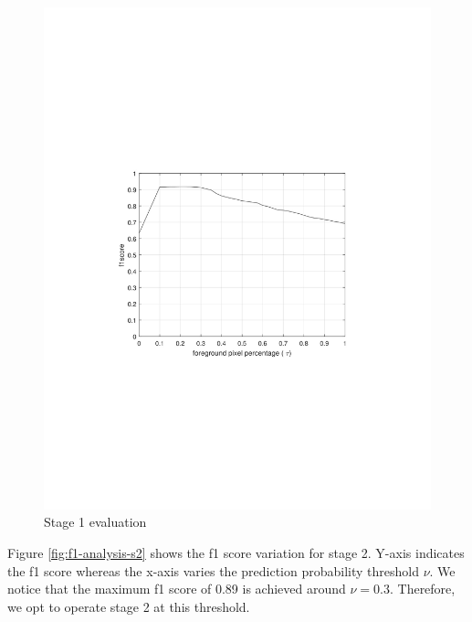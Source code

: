 \begin{figure}
    \centering
    \includegraphics[width=\linewidth,trim={300 670 300 690},clip]{images/f1-analysis-mog.jpg}
    \caption{Stage 1 evaluation}
    \label{fig:f1-analysis-mog}
\end{figure}

Figure \ref{fig:f1-analysis-s2} shows the f1 score variation for stage 2. Y-axis indicates the f1 score whereas the x-axis varies the prediction probability threshold $\nu$. We notice that the maximum f1 score of 0.89 is achieved around $\nu=0.3$. Therefore, we opt to operate stage 2 at this threshold.

